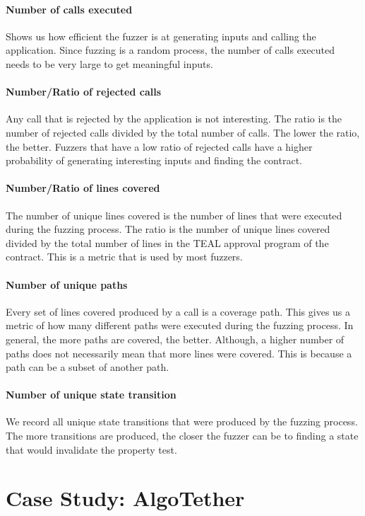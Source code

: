 \paragraph{Number of calls executed} Shows us how efficient the fuzzer is at generating inputs and calling the application.
Since fuzzing is a random process, the number of calls executed needs to be very large to get meaningful inputs.

\paragraph{Number/Ratio of rejected calls} Any call that is rejected by the application is not interesting.
The ratio is the number of rejected calls divided by the total number of calls.
The lower the ratio, the better.
Fuzzers that have a low ratio of rejected calls have a higher probability of generating interesting inputs and finding the contract.

\paragraph{Number/Ratio of lines covered} The number of unique lines covered is the number of lines that were executed during the fuzzing process.
The ratio is the number of unique lines covered divided by the total number of lines in the \ac{TEAL} approval program of the contract.
This is a metric that is used by most fuzzers.

\paragraph{Number of unique paths} Every set of lines covered produced by a call is a coverage path.
This gives us a metric of how many different paths were executed during the fuzzing process.
In general, the more paths are covered, the better.
Although, a higher number of paths does not necessarily mean that more lines were covered.
This is because a path can be a subset of another path.

\paragraph{Number of unique state transition} We record all unique state transitions that were produced by the fuzzing process.
The more transitions are produced, the closer the fuzzer can be to finding a state that would invalidate the property test.




\section{Case Study: AlgoTether}
